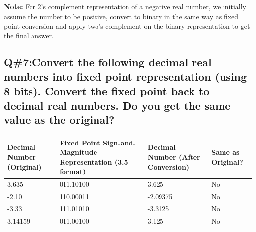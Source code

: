 \textbf{Note:} For 2’s complement representation of a negative real number, we initially assume the number to be positive, convert to binary in the same way as fixed point conversion and apply two’s complement on the binary representation to get the final answer.

\subsection*{Q\#7:Convert the following decimal real numbers into fixed point representation (using 8 bits). Convert the fixed point back to decimal real numbers. Do you get the same value as the original?}
\begin{center}
\begin{tabularx}{\textwidth}{|X|X|X|X|}
\hline
\textbf{Decimal Number (Original)} & \textbf{Fixed Point Sign-and-Magnitude Representation (3.5 format)} & \textbf{Decimal Number (After Conversion)} & \textbf{Same as Original?} \\
\hline
3.635 & 011.10100 & 3.625 & No \\
\hline
-2.10 & 110.00011 & -2.09375 & No \\
\hline
-3.33 & 111.01010 & -3.3125 & No \\
\hline
3.14159 & 011.00100 & 3.125 & No \\
\hline
\end{tabularx}
\end{center}


